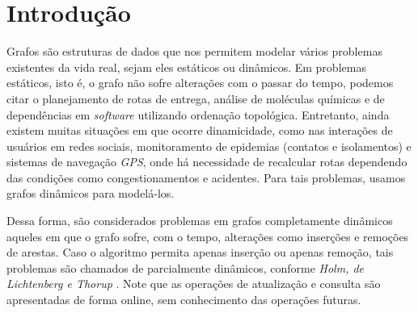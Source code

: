 

\chapter{Introdução}
\label{cap:introducao}

\enlargethispage{.5\baselineskip}

Grafos são estruturas de dados que nos permitem modelar vários problemas existentes da vida real, sejam eles estáticos ou dinâmicos. Em problemas estáticos, isto é, o grafo não sofre alterações com o passar do tempo, podemos citar o planejamento de rotas de entrega, análise de moléculas químicas e de dependências em \textit{software} utilizando ordenação topológica. Entretanto, ainda existem muitas situações em que ocorre dinamicidade, como nas interações de usuários em redes sociais, monitoramento de epidemias (contatos e isolamentos) e sistemas de navegação \textit{GPS}, onde há necessidade de recalcular rotas dependendo das condições como congestionamentos e acidentes. Para tais problemas, usamos grafos dinâmicos para modelá-los.

Dessa forma, são considerados problemas em grafos completamente dinâmicos aqueles em que o grafo sofre, com o tempo, alterações como inserções e remoções 
de arestas. Caso o algoritmo permita apenas inserção ou apenas remoção, tais 
problemas são chamados de parcialmente dinâmicos, conforme \textit{Holm, de Lichtenberg e Thorup} \cite{jacob_holm}. Note que as operações de 
atualização e consulta são apresentadas de forma online, sem conhecimento das  operações futuras.

